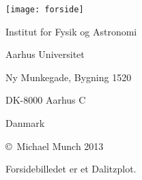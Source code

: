 \begin{titlingpage}
  \thispagestyle{empty}
  \centering
  { \setlength{\baselineskip}{24pt}
    {\Huge {} \par
    }\par
    \par\vspace*{4\onelineskip}
    \par
    \texttt{[image: forside]} 
    \par\vspace*{5\onelineskip}
    \par
    \large{}\par
  }
  \vfill
  \vspace*{2\onelineskip}
  \hfill
  \par\vspace*{2\onelineskip}
  \small
  \par
  \enlargethispage{2\onelineskip}

  \newpage
  \thispagestyle{empty} %
  \small
  \strut\vfill  %
  \begin{flushleft}
    Institut for Fysik og Astronomi \par
    Aarhus Universitet \par
    Ny Munkegade, Bygning 1520 \par
    DK-8000 Aarhus C \par
    Danmark \par
    \vspace{\onelineskip}
    
    \copyright\ Michael Munch 2013                      \par
    Forsidebilledet er et Dalitzplot.
  \end{flushleft}
\end{titlingpage}